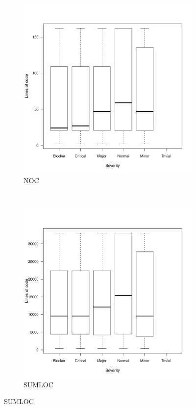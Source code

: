 \begin{figure}
        \begin{subfigure}[b]{0.5\textwidth}
                \centering
                \includegraphics[width=\textwidth]{img/core-classcount-sev-boxplot.pdf}
                \caption{NOC}
                \label{fig:box-sevcore-noc}
        \end{subfigure}%
        ~ %
        \begin{subfigure}[b]{0.5\textwidth}
                \centering
                \includegraphics[width=\textwidth]{img/core-loc-sev-boxplot.pdf}
                \caption{SUMLOC}
                \label{fig:box-sevcore-sumloc}
        \end{subfigure}


\end{figure}
